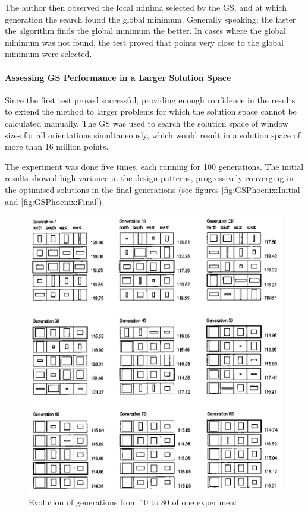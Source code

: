 The author then observed the local minima selected by the GS, and at which generation the search found the global minimum. Generally speaking; the faster the algorithm finds the global minimum the better. In cases where the global minimum was not found, the test proved that points very close to the global minimum were selected.

\paragraph{Assessing GS Performance in a Larger Solution Space}\mbox{}

Since the first test proved successful, providing enough confidence in the results to extend the method to larger problems for which the solution space cannot be calculated manually. The GS was used to search the solution space of window sizes for all orientations simultaneously, which would result in a solution space of more than 16 million points.

The experiment was done five times, each running for 100 generations. The initial results showed high variance in the design patterns, progressively converging in the optimised solutions in the final generations (see figures \ref{fig:GSPhoenix:Initial} and \ref{fig:GSPhoenix:Final}).
\label{sec:GAConvergence}

\begin{figure}[htbp]
\centering
\includegraphics[width=\textwidth]{./Images/23-Gen10-80}
\caption[GA Generations Evolution]{Evolution of generations from 10 to 80 of one experiment \cite{caldas01}}
\label{fig:GenEvol}
\end{figure}

